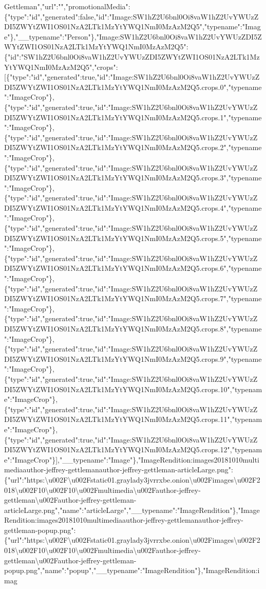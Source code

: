 Gettleman","url":"","promotionalMedia":\{"type":"id","generated":false,"id":"Image:SW1hZ2U6bnl0Oi8vaW1hZ2UvYWUzZDI5ZWYtZWI1OS01NzA2LTk1MzYtYWQ1NmI0MzAzM2Q5","typename":"Image"\},"\_\_typename":"Person"\},"Image:SW1hZ2U6bnl0Oi8vaW1hZ2UvYWUzZDI5ZWYtZWI1OS01NzA2LTk1MzYtYWQ1NmI0MzAzM2Q5":\{"id":"SW1hZ2U6bnl0Oi8vaW1hZ2UvYWUzZDI5ZWYtZWI1OS01NzA2LTk1MzYtYWQ1NmI0MzAzM2Q5","crops":{[}\{"type":"id","generated":true,"id":"Image:SW1hZ2U6bnl0Oi8vaW1hZ2UvYWUzZDI5ZWYtZWI1OS01NzA2LTk1MzYtYWQ1NmI0MzAzM2Q5.crops.0","typename":"ImageCrop"\},\{"type":"id","generated":true,"id":"Image:SW1hZ2U6bnl0Oi8vaW1hZ2UvYWUzZDI5ZWYtZWI1OS01NzA2LTk1MzYtYWQ1NmI0MzAzM2Q5.crops.1","typename":"ImageCrop"\},\{"type":"id","generated":true,"id":"Image:SW1hZ2U6bnl0Oi8vaW1hZ2UvYWUzZDI5ZWYtZWI1OS01NzA2LTk1MzYtYWQ1NmI0MzAzM2Q5.crops.2","typename":"ImageCrop"\},\{"type":"id","generated":true,"id":"Image:SW1hZ2U6bnl0Oi8vaW1hZ2UvYWUzZDI5ZWYtZWI1OS01NzA2LTk1MzYtYWQ1NmI0MzAzM2Q5.crops.3","typename":"ImageCrop"\},\{"type":"id","generated":true,"id":"Image:SW1hZ2U6bnl0Oi8vaW1hZ2UvYWUzZDI5ZWYtZWI1OS01NzA2LTk1MzYtYWQ1NmI0MzAzM2Q5.crops.4","typename":"ImageCrop"\},\{"type":"id","generated":true,"id":"Image:SW1hZ2U6bnl0Oi8vaW1hZ2UvYWUzZDI5ZWYtZWI1OS01NzA2LTk1MzYtYWQ1NmI0MzAzM2Q5.crops.5","typename":"ImageCrop"\},\{"type":"id","generated":true,"id":"Image:SW1hZ2U6bnl0Oi8vaW1hZ2UvYWUzZDI5ZWYtZWI1OS01NzA2LTk1MzYtYWQ1NmI0MzAzM2Q5.crops.6","typename":"ImageCrop"\},\{"type":"id","generated":true,"id":"Image:SW1hZ2U6bnl0Oi8vaW1hZ2UvYWUzZDI5ZWYtZWI1OS01NzA2LTk1MzYtYWQ1NmI0MzAzM2Q5.crops.7","typename":"ImageCrop"\},\{"type":"id","generated":true,"id":"Image:SW1hZ2U6bnl0Oi8vaW1hZ2UvYWUzZDI5ZWYtZWI1OS01NzA2LTk1MzYtYWQ1NmI0MzAzM2Q5.crops.8","typename":"ImageCrop"\},\{"type":"id","generated":true,"id":"Image:SW1hZ2U6bnl0Oi8vaW1hZ2UvYWUzZDI5ZWYtZWI1OS01NzA2LTk1MzYtYWQ1NmI0MzAzM2Q5.crops.9","typename":"ImageCrop"\},\{"type":"id","generated":true,"id":"Image:SW1hZ2U6bnl0Oi8vaW1hZ2UvYWUzZDI5ZWYtZWI1OS01NzA2LTk1MzYtYWQ1NmI0MzAzM2Q5.crops.10","typename":"ImageCrop"\},\{"type":"id","generated":true,"id":"Image:SW1hZ2U6bnl0Oi8vaW1hZ2UvYWUzZDI5ZWYtZWI1OS01NzA2LTk1MzYtYWQ1NmI0MzAzM2Q5.crops.11","typename":"ImageCrop"\},\{"type":"id","generated":true,"id":"Image:SW1hZ2U6bnl0Oi8vaW1hZ2UvYWUzZDI5ZWYtZWI1OS01NzA2LTk1MzYtYWQ1NmI0MzAzM2Q5.crops.12","typename":"ImageCrop"\}{]},"\_\_typename":"Image"\},"ImageRendition:images20181010multimediaauthor-jeffrey-gettlemanauthor-jeffrey-gettleman-articleLarge.png":\{"url":"https:\textbackslash{}u002F\textbackslash{}u002Fstatic01.graylady3jvrrxbe.onion\textbackslash{}u002Fimages\textbackslash{}u002F2018\textbackslash{}u002F10\textbackslash{}u002F10\textbackslash{}u002Fmultimedia\textbackslash{}u002Fauthor-jeffrey-gettleman\textbackslash{}u002Fauthor-jeffrey-gettleman-articleLarge.png","name":"articleLarge","\_\_typename":"ImageRendition"\},"ImageRendition:images20181010multimediaauthor-jeffrey-gettlemanauthor-jeffrey-gettleman-popup.png":\{"url":"https:\textbackslash{}u002F\textbackslash{}u002Fstatic01.graylady3jvrrxbe.onion\textbackslash{}u002Fimages\textbackslash{}u002F2018\textbackslash{}u002F10\textbackslash{}u002F10\textbackslash{}u002Fmultimedia\textbackslash{}u002Fauthor-jeffrey-gettleman\textbackslash{}u002Fauthor-jeffrey-gettleman-popup.png","name":"popup","\_\_typename":"ImageRendition"\},"ImageRendition:imag